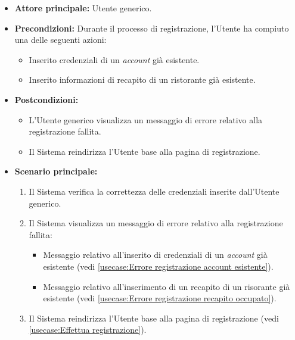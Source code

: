 \label{usecase:Registrazione fallita}

\begin{itemize}
	\item \textbf{Attore principale:} Utente generico.
	\item \textbf{Precondizioni:}
    Durante il processo di registrazione, l'Utente ha compiuto una delle seguenti azioni:
    \begin{itemize}
        \item Inserito credenziali di un \textit{account} già esistente.
        \item Inserito informazioni di recapito di un ristorante già esistente.
    \end{itemize}
	\item \textbf{Postcondizioni:} 
	\begin{itemize}
        \item L'Utente generico visualizza un messaggio di errore relativo alla registrazione fallita.
        \item Il Sistema reindirizza l'Utente base alla pagina di registrazione.
    \end{itemize}

	\item \textbf{Scenario principale:}
	\begin{enumerate}
            \item Il Sistema verifica la correttezza delle credenziali inserite dall'Utente generico.
            \item Il Sistema visualizza un messaggio di errore relativo alla registrazione fallita:
                \begin{itemize}
                    \item Messaggio relativo all'inserito di credenziali di un \textit{account} già esistente (vedi \autoref{usecase:Errore registrazione account esistente}).
                    \item Messaggio relativo all'inserimento di un recapito di un risorante già esistente (vedi \autoref{usecase:Errore registrazione recapito occupato}).
                \end{itemize}
            \item Il Sistema reindirizza l'Utente base alla pagina di registrazione (vedi \autoref{usecase:Effettua registrazione}).   
    \end{enumerate}
	
\end{itemize}



